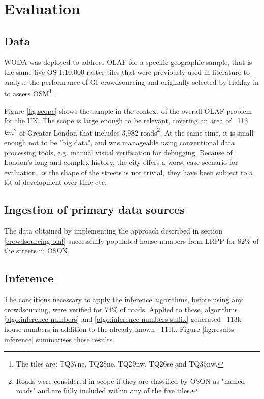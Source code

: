 \section{Evaluation}

\subsection{Data}

WODA was deployed to address OLAF for a specific geographic sample, that is the same five OS 1:10,000 raster tiles that were previously used in literature to analyse the performance of GI crowdsourcing and originally selected by Haklay in \cite{Haklay:2010vs} to assess OSM\footnote{The tiles are: TQ37ne, TQ28ne, TQ29nw, TQ26se and TQ36nw.}.

Figure \ref{fig:scope} shows the sample in the context of the overall OLAF problem for the UK. The scope is large enough to be relevant, covering an area of ~113 $ km^2 $ of Greater London that includes 3,982 roads\footnote{Roads were considered in scope if they are classified by OSON as "named roads" and are fully included within any of the five tiles.}. At the same time, it is small enough not to be "big data", and was manageable using conventional data processing tools, e.g. manual visual verification for debugging. Because of London's long and complex history, the city offers a worst case scenario for evaluation, as the shape of the streets is not trivial, they have been subject to a lot of development over time etc. 

\subsection{Ingestion of primary data sources}

The data obtained by implementing the approach described in section \ref{crowdsourcing-olaf} successfully populated house numbers from LRPP for 82\% of the streets in OSON.

\subsection{Inference}

The conditions necessary to apply the inference algorithms, before using any crowdsourcing, were verified for 74\% of roads. Applied to these, algorithms \ref{algo:inference-numbers} and \ref{algo:inference-numbers-suffix} generated ~113k house numbers in addition to the already known ~111k. Figure \ref{fig:results-inference} summarises these results.

